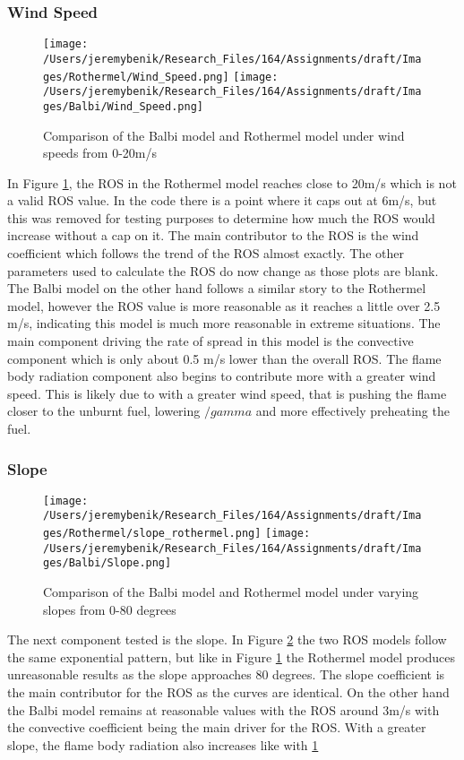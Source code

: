 \documentclass{article}
\begin{document}
\subsubsection{Wind Speed}
\begin{figure}
\centering
  \texttt{[image: /Users/jeremybenik/Research\_Files/164/Assignments/draft/Images/Rothermel/Wind\_Speed.png]}
  \texttt{[image: /Users/jeremybenik/Research\_Files/164/Assignments/draft/Images/Balbi/Wind\_Speed.png]}
  \caption{Comparison of the Balbi model and Rothermel model under wind speeds from 0-20m/s}
  \label{Wind Speed}
\end{figure}
\indent In Figure \ref{Wind Speed}, the ROS in the Rothermel model reaches close to 20m/s which is not a valid ROS value. In the code there is a point where it caps out at 6m/s, but this was removed for testing purposes to determine how much the ROS would increase without a cap on it. The main contributor to the ROS is the wind coefficient which follows the trend of the ROS almost exactly. The other parameters used to calculate the ROS do now change as those plots are blank. The Balbi model on the other hand follows a similar story to the Rothermel model, however the ROS value is more reasonable as it reaches a little over 2.5 m/s, indicating this model is much more reasonable in extreme situations. The main component driving the rate of spread in this model is the convective component which is only about 0.5 m/s lower than the overall ROS. The flame body radiation component also begins to contribute more with a greater wind speed. This is likely due to with a greater wind speed, that is pushing the flame closer to the unburnt fuel, lowering $/gamma$ and more effectively preheating the fuel. 
\subsubsection{Slope}
\begin{figure}
\centering
  \texttt{[image: /Users/jeremybenik/Research\_Files/164/Assignments/draft/Images/Rothermel/slope\_rothermel.png]}
  \texttt{[image: /Users/jeremybenik/Research\_Files/164/Assignments/draft/Images/Balbi/Slope.png]}
  \caption{Comparison of the Balbi model and Rothermel model under varying slopes from 0-80 degrees}
  \label{Slope}
\end{figure}
\indent The next component tested is the slope. In Figure \ref{Slope} the two ROS models follow the same exponential pattern, but like in Figure \ref{Wind Speed} the Rothermel model produces unreasonable results as the slope approaches 80 degrees. The slope coefficient is the main contributor for the ROS as the curves are identical. On the other hand the Balbi model remains at reasonable values with the ROS around 3m/s with the convective coefficient being the main driver for the ROS. With a greater slope, the flame body radiation also increases like with \ref{Wind Speed}
\end{document}
